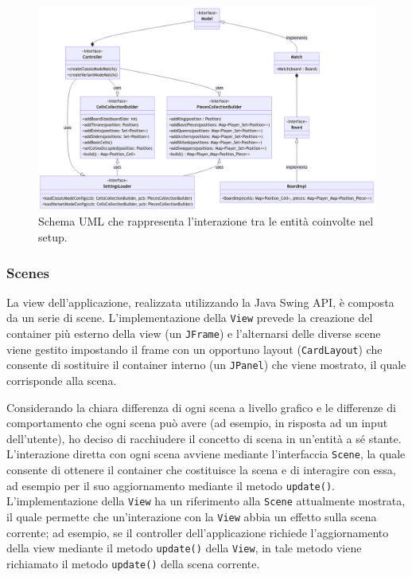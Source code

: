 \documentclass[a4paper,12pt]{report}
\begin{document}
\begin{figure}[H]
\centering
\includegraphics[width=\textwidth]{images/match-setup.png}
\caption{Schema UML che rappresenta l'interazione tra le entità coinvolte nel setup.}
\label{images:match-setup}
\end{figure}

\subsubsection{Scenes}

La view dell'applicazione, realizzata utilizzando la Java Swing API, è composta da un serie di scene.
L'implementazione della \texttt{View} prevede la creazione del container più esterno della view (un \texttt{JFrame}) e l'alternarsi delle diverse scene viene gestito impostando il frame con un opportuno layout (\texttt{CardLayout}) che consente di sostituire il container interno (un \texttt{JPanel}) che viene mostrato, il quale corrisponde alla scena.

Considerando la chiara differenza di ogni scena a livello grafico e le differenze di comportamento che ogni scena può avere (ad esempio, in risposta ad un input dell'utente), ho deciso di racchiudere il concetto di scena in un'entità a sé stante. L'interazione diretta con ogni scena avviene mediante l'interfaccia \texttt{Scene}, la quale consente di ottenere il container che costituisce la scena e di interagire con essa, ad esempio per il suo aggiornamento mediante il metodo \texttt{update()}. L'implementazione della \texttt{View} ha un riferimento alla \texttt{Scene} attualmente mostrata, il quale permette che un'interazione con la \texttt{View} abbia un effetto sulla scena corrente; ad esempio, se il controller dell'applicazione richiede l'aggiornamento della view mediante il metodo \texttt{update()} della \texttt{View}, in tale metodo viene richiamato il metodo \texttt{update()} della scena corrente.
\end{document}
